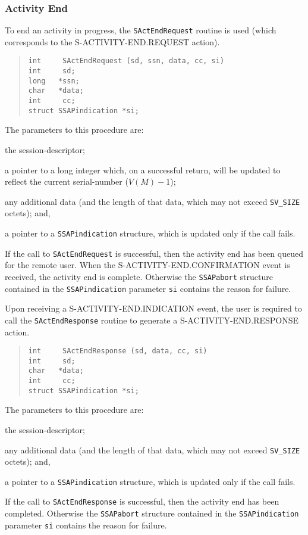 \subsubsection	{Activity End}
To end an activity in progress,
the \verb"SActEndRequest" routine is used
(which corresponds to the {\sf S-ACTIVITY-END.REQUEST\/} action).
\begin{quote}\small\begin{verbatim}
int     SActEndRequest (sd, ssn, data, cc, si)
int     sd;
long   *ssn;
char   *data;
int     cc;
struct SSAPindication *si;
\end{verbatim}\end{quote}
The parameters to this procedure are:
\begin{describe}
\item[\verb"sd":] the session-descriptor;

\item[\verb"ssn":] a pointer to a long integer which,
on a successful return,
will be updated to reflect the current serial-number ($V(M)-1$);

\item[\verb"data"/\verb"cc":] any additional data
(and the length of that data, which may not exceed \verb"SV_SIZE" octets);
and,

\item[\verb"si":] a pointer to a \verb"SSAPindication" structure, which is
updated only if the call fails.
\end{describe}
If the call to \verb"SActEndRequest" is successful,
then the activity end has been queued for the remote user.
When the {\sf S-ACTIVITY-END.CONFIRMATION\/} event is received,
the activity end is complete.
Otherwise the \verb"SSAPabort" structure contained in
the \verb"SSAPindication" parameter
\verb"si" contains the reason for failure.

Upon receiving a {\sf S-ACTIVITY-END.INDICATION\/} event,
the user is required to call the \verb"SActEndResponse" routine
to generate a {\sf S-ACTIVITY-END.RESPONSE\/} action.
\begin{quote}\small\begin{verbatim}
int     SActEndResponse (sd, data, cc, si)
int     sd;
char   *data;
int     cc;
struct SSAPindication *si;
\end{verbatim}\end{quote}
The parameters to this procedure are:
\begin{describe}
\item[\verb"sd":] the session-descriptor;

\item[\verb"data"/\verb"cc":] any additional data
(and the length of that data, which may not exceed \verb"SV_SIZE" octets);
and,

\item[\verb"si":] a pointer to a \verb"SSAPindication" structure, which is
updated only if the call fails.
\end{describe}
If the call to \verb"SActEndResponse" is successful,
then the activity end has been completed.
Otherwise the \verb"SSAPabort" structure contained in
the \verb"SSAPindication" parameter
\verb"si" contains the reason for failure.

